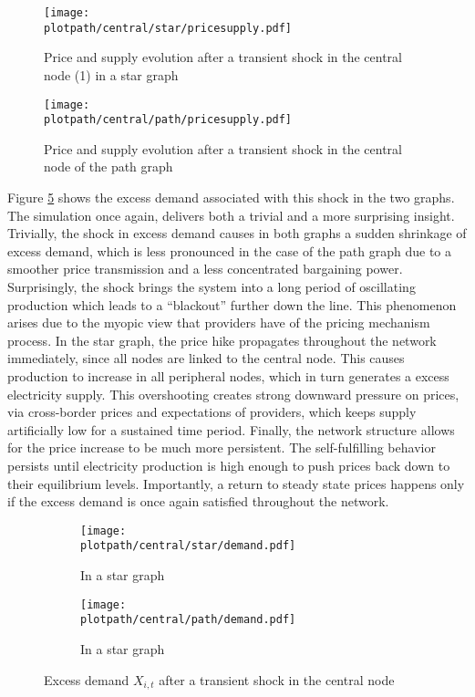 \newpage
\begin{figure}[H]
  \centering
  \texttt{[image: \\plotpath/central/star/pricesupply.pdf]}
  \caption{Price and supply evolution after a transient shock in the central node (1) in a star graph} \label{fig:transshockcen_star}
\end{figure}

\begin{figure}[H]
  \centering
  \texttt{[image: \\plotpath/central/path/pricesupply.pdf]}
  \caption{Price and supply evolution after a transient shock in the central node of the path graph} \label{fig:transshockcen_path}
\end{figure}
\newpage

Figure \ref{fig:demandshock} shows the excess demand associated with this shock in the two graphs. The simulation once again, delivers both a trivial and a more surprising insight. Trivially, the shock in excess demand causes in both graphs a sudden shrinkage of excess demand, which is less pronounced in the case of the path graph due to a smoother price transmission and a less concentrated bargaining power. Surprisingly, the shock brings the system into a long period of oscillating production which leads to a ``blackout'' further down the line. This phenomenon arises due to the myopic view that providers have of the pricing mechanism process. In the star graph, the price hike propagates throughout the network immediately, since all nodes are linked to the central node. This causes production to increase in all peripheral nodes, which in turn generates a excess electricity supply. This overshooting creates strong downward pressure on prices, via cross-border prices and expectations of providers, which keeps supply artificially low for a sustained time period. Finally, the network structure allows for the price increase to be much more persistent. The self-fulfilling behavior persists until electricity production is high enough to push prices back down to their equilibrium levels. Importantly, a return to steady state prices happens only if the excess demand is once again satisfied throughout the network.

\begin{center}
  \begin{figure}[H]
    \begin{subfigure}{0.475\textwidth}
      \centering
      \texttt{[image: \\plotpath/central/star/demand.pdf]}
      \caption{In a star graph} \label{fig:demandshock_star}
    \end{subfigure} \hfill
    \begin{subfigure}{0.475\textwidth}
      \centering
      \texttt{[image: \\plotpath/central/path/demand.pdf]}
      \caption{In a star graph} \label{fig:demandshock_path}
    \end{subfigure}
    \caption{Excess demand $X_{i, t}$ after a transient shock in the central node} \label{fig:demandshock}
  \end{figure}
\end{center}

